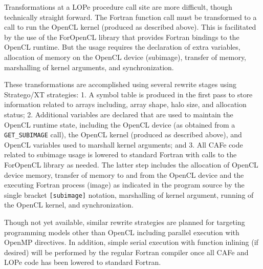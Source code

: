Transformations at a LOPe procedure call site are more difficult, though technically straight forward.
The Fortran function call must be transformed to a call to run the OpenCL kernel (produced as described
above).  This is facilitated by the use of the ForOpenCL library that provides Fortran bindings to the
OpenCL runtime\cite{foropencl}.  But the usage requires the declaration of extra variables,
allocation of memory on the OpenCL device (subimage), transfer of memory, marshalling of kernel
arguments, and synchronization.

These transformations are accomplished using several rewrite stages using Stratego/XT strategies:
1. A symbol table is produced in the first pass to store information related to arrays including,
array shape, halo size, and allocation status;
2. Additional variables are declared that are used to maintain the OpenCL runtime state, including
the OpenCL device (as obtained from a \texttt{GET\_SUBIMAGE} call), the OpenCL kernel (produced as
described above), and OpenCL variables used to marshall kernel arguments; and
3. All CAFe code related to subimage usage is lowered to standard Fortran with calls to the
ForOpenCL library as needed.  The latter step includes the allocation of OpenCL device memory,
transfer of memory to and from the OpenCL device and the executing Fortran process (image) as
indicated in the program source by the single bracket \texttt{[subimage]} notation, marshalling
of kernel argument, running of the OpenCL kernel, and synchronization.

Though not yet available, similar rewrite strategies are planned for targeting programming models
other than OpenCL including parallel execution with OpenMP directives.  In addition, simple serial
execution with function inlining (if desired) will be performed by the regular Fortran compiler once
all CAFe and LOPe code has been lowered to standard Fortran.



